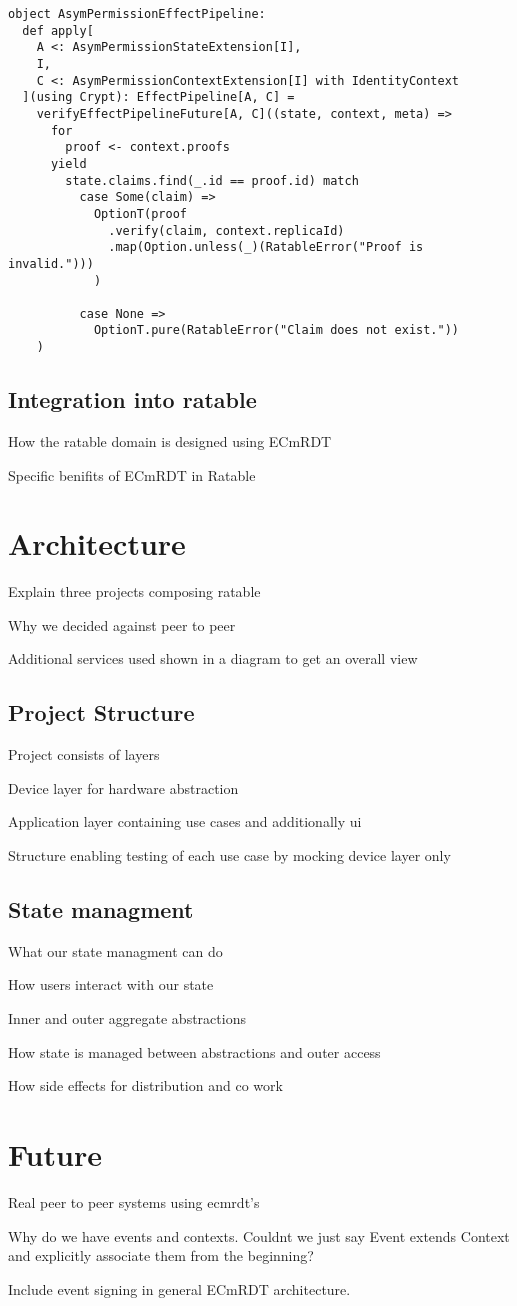 \documentclass[
	ngerman,
	ruledheaders=section,   %
	class=report,		    %
	thesis={type=bachelor}, %
	accentcolor=9c,			%
	custommargins=true,    %
	marginpar=false,        %
	parskip=half-,          %
	fontsize=11pt,          %
]{tudapub}
\begin{document}
\begin{lstlisting}
object AsymPermissionEffectPipeline:
  def apply[
    A <: AsymPermissionStateExtension[I], 
    I, 
    C <: AsymPermissionContextExtension[I] with IdentityContext
  ](using Crypt): EffectPipeline[A, C] =
    verifyEffectPipelineFuture[A, C]((state, context, meta) =>
      for
        proof <- context.proofs
      yield
        state.claims.find(_.id == proof.id) match
          case Some(claim) => 
            OptionT(proof
              .verify(claim, context.replicaId)
              .map(Option.unless(_)(RatableError("Proof is invalid.")))
            )

          case None => 
            OptionT.pure(RatableError("Claim does not exist."))
    )
\end{lstlisting}


\section{Integration into ratable}
How the ratable domain is designed using ECmRDT

Specific benifits of ECmRDT in Ratable

\chapter{Architecture}
Explain three projects composing ratable

Why we decided against peer to peer

Additional services used shown in a diagram to get an overall view

\section{Project Structure}
Project consists of layers

Device layer for hardware abstraction

Application layer containing use cases and additionally ui

Structure enabling testing of each use case by mocking device layer only

\section{State managment}
What our state managment can do

How users interact with our state

Inner and outer aggregate abstractions

How state is managed between abstractions and outer access

How side effects for distribution and co work

\chapter{Future}
Real peer to peer systems using ecmrdt's

Why do we have events and contexts. Couldnt we just say Event extends Context and explicitly associate them from the beginning?

Include event signing in general ECmRDT architecture.
\end{document}

